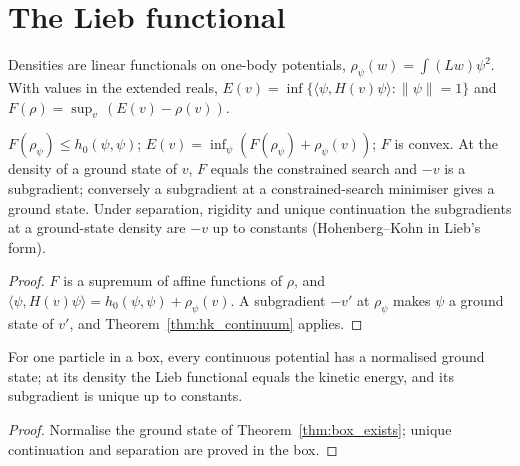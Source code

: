 \section{The Lieb functional}

Densities are linear functionals on one-body potentials, $\rho_\psi(w)=\int(Lw)\psi^2$. With values in the extended
reals, $E(v)=\inf\{\langle\psi,H(v)\psi\rangle:\|\psi\|=1\}$ and $F(\rho)=\sup_v\,(E(v)-\rho(v))$.

\begin{theorem}
  \label{thm:lieb}
  \leanok
  $F(\rho_\psi)\le h_0(\psi,\psi)$; $E(v)=\inf_\psi(F(\rho_\psi)+\rho_\psi(v))$; $F$ is convex. At the density of a
  ground state of $v$, $F$ equals the constrained search and $-v$ is a subgradient; conversely a subgradient at a
  constrained-search minimiser gives a ground state. Under separation, rigidity and unique continuation the
  subgradients at a ground-state density are $-v$ up to constants (Hohenberg--Kohn in Lieb's form).
\end{theorem}
\begin{proof}
  \leanok
  $F$ is a supremum of affine functions of $\rho$, and $\langle\psi,H(v)\psi\rangle=h_0(\psi,\psi)+\rho_\psi(v)$.
  A subgradient $-v'$ at $\rho_\psi$ makes $\psi$ a ground state of $v'$, and Theorem~\ref{thm:hk_continuum}
  applies.
\end{proof}

\begin{theorem}
  \label{thm:lieb_box}
  \leanok
  For one particle in a box, every continuous potential has a normalised ground state; at its density the Lieb
  functional equals the kinetic energy, and its subgradient is unique up to constants.
\end{theorem}
\begin{proof}
  \leanok
  Normalise the ground state of Theorem~\ref{thm:box_exists}; unique continuation and separation are proved in the
  box.
\end{proof}

